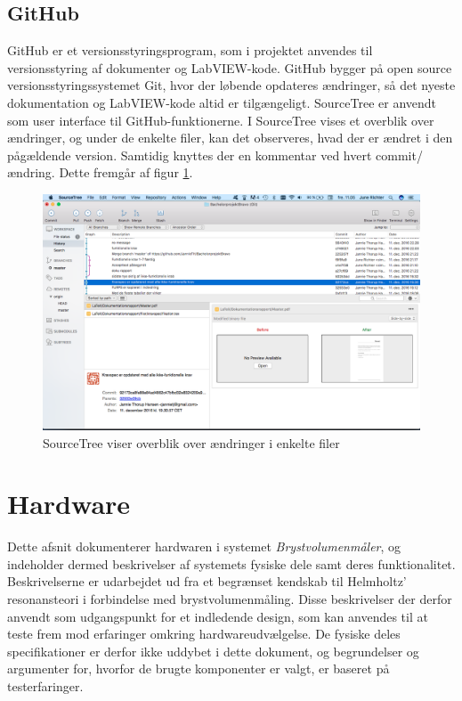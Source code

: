 \subsection{GitHub}
GitHub er et versionsstyringsprogram, som i projektet anvendes til versionsstyring af dokumenter og LabVIEW-kode. GitHub
bygger på open source versionsstyringssystemet Git, hvor der løbende opdateres ændringer, så det nyeste dokumentation og LabVIEW-kode altid er tilgængeligt. SourceTree er anvendt som user interface til GitHub-funktionerne. I SourceTree vises et overblik over ændringer, og under de enkelte filer, kan det observeres, hvad der er ændret i den pågældende version. Samtidig knyttes der en kommentar ved hvert commit/ ændring. Dette fremgår af figur \ref{fig:git}. 

\begin{figure}[htb]
\centering
\includegraphics[width=5in]{github.png}
\caption{SourceTree viser overblik over ændringer i enkelte filer}
\label{fig:git}	
\end{figure}


\section{Hardware}
Dette afsnit dokumenterer hardwaren i systemet \textit{Brystvolumenmåler}, og indeholder dermed beskrivelser af systemets fysiske dele samt deres funktionalitet. Beskrivelserne er udarbejdet ud fra et begrænset kendskab til Helmholtz' resonansteori i forbindelse med brystvolumenmåling. Disse beskrivelser der derfor anvendt som udgangspunkt for et indledende design, som kan anvendes til at teste frem mod erfaringer omkring hardwareudvælgelse. De fysiske deles specifikationer er derfor ikke uddybet i dette dokument, og begrundelser og argumenter for, hvorfor de brugte komponenter er valgt, er baseret på testerfaringer. 

